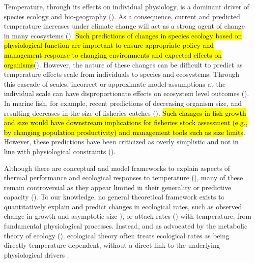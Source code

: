 \documentclass[11pt]{article}\usepackage[]{graphicx}\usepackage[]{color,soul}
\begin{document}
Temperature, through its effects on individual physiology, is a dominant driver of species ecology and bio-geography (\citealt{deutsch_climate_2015,pinsky_marine_2013}). As a consequence, current and predicted temperature increases under climate change will act as a strong agent of change in many ecosystems (\citealt{deutsch_climate_2015, stuart-smith_thermal_2015, parmesan_globally_2003, walther_ecological_2002}).  \hl{Such predictions of changes in species ecology based on physiological function are important to ensure appropriate policy and management response to changing environments and expected effects on organisms}(\citealt{mckenzieconservation2016, pattersonperspective2016}). However, the nature of these changes can be difficult to predict as temperature effects scale from individuals to species and ecosystems. Through this cascade of scales, incorrect or approximate model assumptions at the individual scale can have disproportionate effects on ecosystem level outcomes (\citealt{brander_overconfidence_2013, lefevre_models_2017}). In marine fish, for example, recent predictions of decreasing organism size, and resulting decreases in the size of fisheries catches (\citealt{cheung_shrinking_2013}). \hl{Such changes in fish growth and size would have downstream implications for fisheries stock assessment (e.g., by changing population productivity) and management tools such as size limits}. However, these predictions have been criticized as overly simplistic and not in line with physiological constraints (\citealt{brander_overconfidence_2013, lefevre_models_2017}).

Although there are conceptual and model frameworks to explain aspects of thermal performance and ecological responses to temperature (\citealt{fry_effects_1947,brown_toward_2004,pauly_sound_2017,portner_oxygen-and_2010}), many of these remain controversial as they appear limited in their generality or predictive capacity (\citealt{lefevre_models_2017,jutfelt_oxygen-and_2018}). To our knowledge, no general theoretical framework exists to quantitatively explain and predict changes in  ecological rates, such as observed change in growth and asymptotic size \cite[e.g., the temerature-size rule in ectotherms;][]{angilletta_temperature_2004,atkinson_temperature_1994}), or attack rates (\citealt{englund_temperature_2011,rall_universal_2012}) with temperature, from fundamental physiological processes. Instead, and as advocated by the metabolic theory of ecology (\citealt{brown_toward_2004}), ecological theory often treats ecological rates as being directly temperature dependent, without a direct link to the underlying physiological drivers \cite[e.g., ][]{angilletta_temperature_2004,vucic-pestic_warming_2011, guiet_effects_2016}. 
\end{document}
